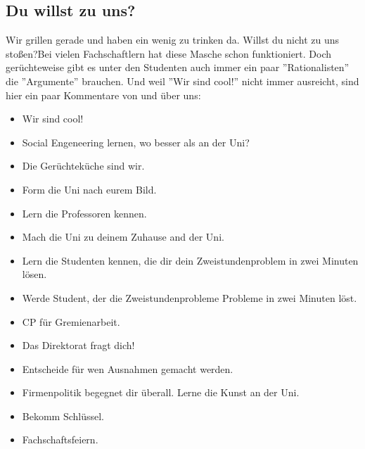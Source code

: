 	\subsection{Du willst zu uns?}
		\glqq Wir grillen gerade und haben ein wenig zu trinken da. Willst du nicht zu uns stoßen?\grqq { }Bei vielen Fachschaftlern hat diese Masche schon funktioniert. Doch gerüchteweise gibt es unter den Studenten auch immer ein paar ''Rationalisten'' die ''Argumente'' brauchen. Und weil ''Wir sind cool!'' nicht immer ausreicht, sind hier ein paar Kommentare von und über uns:
		\begin{itemize}
			\item Wir sind cool!
			\item Social Engeneering lernen, wo besser als an der Uni?
			\item Die Gerüchteküche sind wir.
			\item Form die Uni nach eurem Bild.
			\item Lern die Professoren kennen.
			\item Mach die Uni zu deinem Zuhause and der Uni.
			\item Lern die Studenten kennen, die dir dein Zweistundenproblem in zwei Minuten lösen.
			\item Werde Student, der die Zweistundenprobleme Probleme in zwei Minuten löst.
			\item CP für Gremienarbeit.
			\item Das Direktorat fragt dich!
			\item Entscheide für wen Ausnahmen gemacht werden.
			\item Firmenpolitik begegnet dir überall. Lerne die Kunst an der Uni.
			\item Bekomm Schlüssel.
			\item Fachschaftsfeiern.
		\end{itemize}
